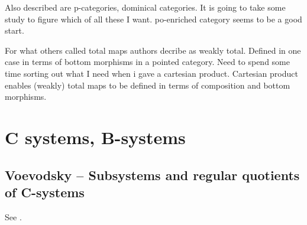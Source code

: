 \documentclass[14pt,a4paper]{scrartcl}
\begin{document}
Also described are p-categories, dominical categories. It is going to take some study to figure which of all these I want.
po-enriched category seems to be a good start. 

For what others called total maps authors decribe as weakly total. Defined in one case in 
terms of bottom morphisms in a pointed category. Need to spend some time sorting out what I need when i gave a cartesian product. Cartesian product enables (weakly) total maps to be defined in terms of composition and bottom morphisms. 
  
\section{C systems, B-systems}
\subsection{Voevodsky -- Subsystems and regular quotients of C-systems}
See \cite{Voevodsky16}.
\end{document}
